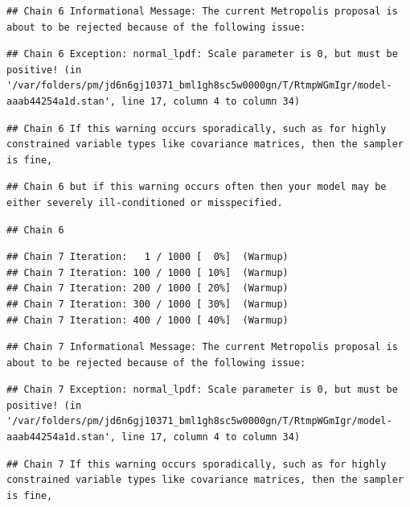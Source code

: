 \documentclass[
]{book}
\begin{document}
\begin{verbatim}
## Chain 6 Informational Message: The current Metropolis proposal is about to be rejected because of the following issue:
\end{verbatim}

\begin{verbatim}
## Chain 6 Exception: normal_lpdf: Scale parameter is 0, but must be positive! (in '/var/folders/pm/jd6n6gj10371_bml1gh8sc5w0000gn/T/RtmpWGmIgr/model-aaab44254a1d.stan', line 17, column 4 to column 34)
\end{verbatim}

\begin{verbatim}
## Chain 6 If this warning occurs sporadically, such as for highly constrained variable types like covariance matrices, then the sampler is fine,
\end{verbatim}

\begin{verbatim}
## Chain 6 but if this warning occurs often then your model may be either severely ill-conditioned or misspecified.
\end{verbatim}

\begin{verbatim}
## Chain 6
\end{verbatim}

\begin{verbatim}
## Chain 7 Iteration:   1 / 1000 [  0%]  (Warmup) 
## Chain 7 Iteration: 100 / 1000 [ 10%]  (Warmup) 
## Chain 7 Iteration: 200 / 1000 [ 20%]  (Warmup) 
## Chain 7 Iteration: 300 / 1000 [ 30%]  (Warmup) 
## Chain 7 Iteration: 400 / 1000 [ 40%]  (Warmup)
\end{verbatim}

\begin{verbatim}
## Chain 7 Informational Message: The current Metropolis proposal is about to be rejected because of the following issue:
\end{verbatim}

\begin{verbatim}
## Chain 7 Exception: normal_lpdf: Scale parameter is 0, but must be positive! (in '/var/folders/pm/jd6n6gj10371_bml1gh8sc5w0000gn/T/RtmpWGmIgr/model-aaab44254a1d.stan', line 17, column 4 to column 34)
\end{verbatim}

\begin{verbatim}
## Chain 7 If this warning occurs sporadically, such as for highly constrained variable types like covariance matrices, then the sampler is fine,
\end{verbatim}
\end{document}
